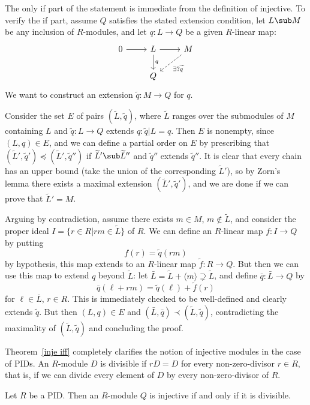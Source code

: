 \begin{theorem}[Baer]\label{inje iff}
The only if part of the statement is immediate from the definition of injective. To verify the if part, assume $Q$ satisfies the stated extension condition, let $L\sub M$ be any inclusion of $R$-modules, and let $q:L\to Q$ be a given $R$-linear map:
\[\begin{tikzcd}
0\ar[r]&L\ar[d,"q"]\ar[r]&M\ar[ld,swap,dashed,swap,"\exists?\widetilde{q}"]\\
&Q
\end{tikzcd}\]
We want to construct an extension $\widetilde{q}:M\to Q$ for $q$.\par
Consider the set $E$ of pairs $(\widetilde{L},\widetilde{q})$, where $\widetilde{L}$ ranges over the submodules of $M$ containing $L$ and $\widetilde{q}:L\to Q$ extends $q:\widetilde{q}|L=q$. Then $E$ is nonempty, since $(L,q)\in E$, and we can define a partial order on $E$ by prescribing that $(\widetilde{L}',\widetilde{q}')\preceq(\widetilde{L}',\widetilde{q}'')$ if $\widetilde{L}'\sub\widetilde{L}''$ and $\widetilde{q}''$ extends $\widetilde{q}''$. It is clear that every chain has an upper bound (take the union of the corresponding $\widetilde{L}'$), so by Zorn's lemma there exists a maximal extension $(\widetilde{L}',\widetilde{q}')$, and we are done if we can prove that $\widetilde{L}'=M$.\par
Arguing by contradiction, assume there exists $m\in M$, $m\notin\widetilde{L}$, and consider the
proper ideal $I=\{r\in R|rm\in\widetilde{L}\}$ of $R$. We can define an $R$-linear map $f:I\to Q$
by putting
\[f(r)=\widetilde{q}(rm)\]
by hypothesis, this map extends to an $R$-linear map $\widetilde{f}:R\to Q$. But then we can use this map to extend $q$ beyond $\widetilde{L}$: let $\bar{L}=\widetilde{L}+\langle m\rangle\supsetneq\widetilde{L}$, and define $\bar{q}:\bar{L}\to Q$ by
\[\bar{q}(\ell+rm)=\widetilde{q}(\ell)+\widetilde{f}(r)\]
for $\ell\in\bar{L}$, $r\in R$. This is immediately checked to be well-defined and clearly extends $\widetilde{q}$. But then $(L,q)\in E$ and $(\bar{L},\bar{q})\prec(\widetilde{L},\widetilde{q})$, contradicting the maximality of $(\widetilde{L},\widetilde{q})$ and concluding the proof.
\end{theorem}
Theorem~\ref{inje iff} completely clarifies the notion of injective modules in the case of PIDs. An $R$-module $D$ is divisible if $rD=D$ for every non-zero-divisor $r\in R$, that is, if we can divide every element of $D$ by every non-zero-divisor of $R$.
\begin{corollary}\label{PID injec iff}
Let $R$ be a PID. Then an $R$-module $Q$ is injective if and only if it is divisible.
\end{corollary}
